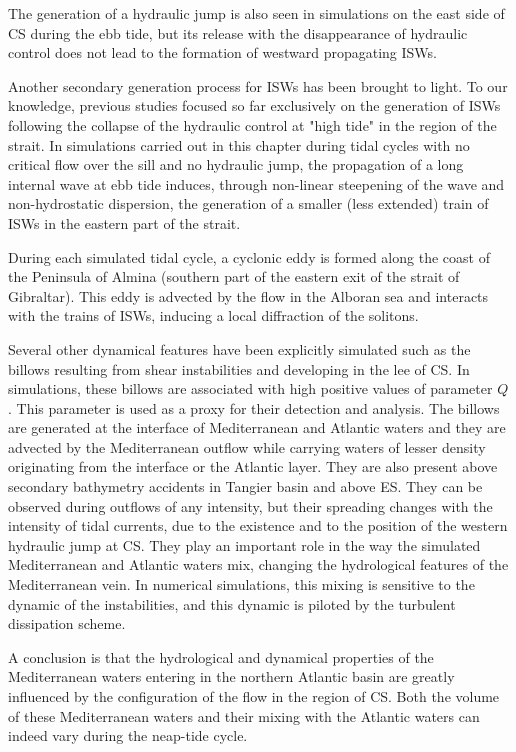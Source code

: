 The generation of a hydraulic jump is also seen in simulations on the east side of CS  during the ebb tide, but its release with the disappearance of hydraulic control does not lead to the formation of westward propagating ISWs.

Another secondary generation process for ISWs has been brought to light. To our knowledge, previous studies focused so far exclusively on the generation of ISWs following the collapse of the hydraulic control at "high tide" in the region of the strait. In simulations carried out in this chapter during tidal cycles with no critical flow over the sill and no hydraulic jump, the propagation of a long internal wave at ebb tide induces, through non-linear steepening of the wave and non-hydrostatic dispersion, the generation of a smaller (less extended) train of ISWs in the eastern part of the strait.

During each simulated tidal cycle, a cyclonic eddy is formed along the coast of the Peninsula of Almina (southern part of the eastern exit of the strait of Gibraltar). This eddy is advected by the flow in the Alboran sea and interacts with the trains of ISWs, inducing a local diffraction of the solitons. 

Several other dynamical features have been explicitly simulated such as the billows resulting from shear instabilities and developing in the lee of CS. In simulations, these billows are associated with high positive values of parameter $Q$. This parameter is used as a proxy for their detection and analysis. The billows are generated at the interface of Mediterranean and Atlantic waters and they are advected by the Mediterranean outflow while carrying waters of lesser density originating from the interface or the Atlantic layer. They are also present above secondary bathymetry accidents in Tangier basin and above ES. They can be observed during outflows of any intensity, but their spreading changes with the intensity of tidal currents, due to the existence and to the position of the western hydraulic jump at CS. They play an important role in the way the simulated Mediterranean and Atlantic waters mix, changing the hydrological features of the Mediterranean vein. In numerical simulations, this mixing is sensitive to the dynamic of the instabilities, and this dynamic is piloted by the turbulent dissipation scheme.

A conclusion is that the hydrological and dynamical properties of the Mediterranean waters entering in the northern Atlantic basin are greatly influenced by the configuration of the flow in the region of CS. Both the volume of these Mediterranean waters and their mixing with the Atlantic waters can indeed vary during the neap-tide cycle. 

